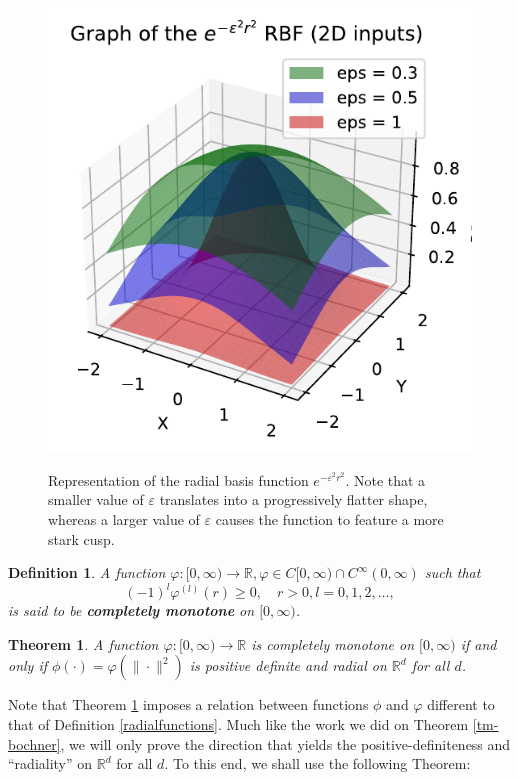 \documentclass[12pt]{report} %
\newtheorem{definition}{Definition}
\newtheorem{theorem}{Theorem}
\newcommand{\tmstrong}[1]{\textbf{#1}}
\begin{document}
  \begin{figure}[ht]
    \centering
    {\includegraphics[width=.5\textwidth, clip=true, trim={0 0 .1cm 0}]{imagenes/rbf_discussion/negative-exp-rbf.pdf}}
    \caption{Representation of the radial basis function $e^{-\varepsilon^2 r^2}$. Note that a smaller value of $\varepsilon$ translates into a progressively flatter shape, whereas a larger value of $\varepsilon$ causes the function to feature a more stark cusp.}
    \label{fig:negative-exp-rbf}
\end{figure}



\begin{definition}
  A function $\varphi : [0, \infty) \rightarrow \mathbb{R}, \varphi \in C [0,
  \infty) \cap C^{\infty} (0, \infty)$ such that
  \[ (- 1)^{l} \varphi^{(l)} (r) \geq 0, \quad r > 0,
     l= 0, 1, 2, \ldots, \]
  is said to be {\tmstrong{completely monotone}} on $[0, \infty)$.
\end{definition}

\begin{theorem}
  \label{thm-completely-monotone-iff-positive-definite-radial}A function
  $\varphi : [0, \infty) \rightarrow \mathbb{R}$ is completely monotone on
  $[0, \infty)$ if and only if $\phi (\cdot) = \varphi (\| \cdot \|^2)$ is
  positive definite and radial on $\mathbb{R}^d$ for all $d$.
\end{theorem}

Note that Theorem \ref{thm-completely-monotone-iff-positive-definite-radial}
imposes a relation between functions $\phi$ and $\varphi$ different to that of
Definition \ref{radialfunctions}. Much like the work we did on Theorem
\ref{tm-bochner}, we will only prove the direction that yields the
positive-definiteness and ``radiality'' on $\mathbb{R}^d$ for all $d$. To this
end, we shall use the following Theorem:
\end{document}
